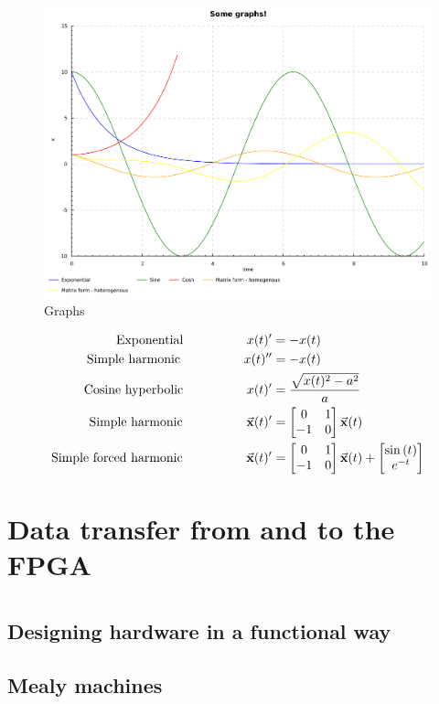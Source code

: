 \begin{figure}[h!]
	\centering
	\includegraphics[width=\textwidth]{../haskell/output.pdf}
	\caption{Graphs}
	\label{fig:solver_example}
\end{figure}

\begin{align}
\text{Exponential}\hspace{50pt}{}			x(t)' &= -x(t)  \\
\text{Simple harmonic}\hspace{50pt}{}		x(t)'' &= -x(t) \\
\text{Cosine hyperbolic}\hspace{50pt}{}		x(t)' &= \frac{\sqrt{x(t)^{2} - a^{2}}}{a} \\
\text{Simple harmonic}\hspace{50pt}{}		\vec{\mathbf{x}}(t)' &= \begin{bmatrix} 0 & 1 \\ -1 & 0 \\ \end{bmatrix}\vec{\mathbf{x}}(t) \\
\text{Simple forced harmonic}\hspace{50pt}{}	\vec{\mathbf{x}}(t)' &= \begin{bmatrix} 0 & 1 \\ -1 & 0 \\ \end{bmatrix}\vec{\mathbf{x}}(t) + \begin{bmatrix} \sin{(t)} \\ e^{-t} \\ \end{bmatrix}
\end{align}









\section{Data transfer from and to the FPGA}

\section{\clash{}}
\label{s:clash}
\subsection{Designing hardware in a functional way}
\subsection{Mealy machines}
